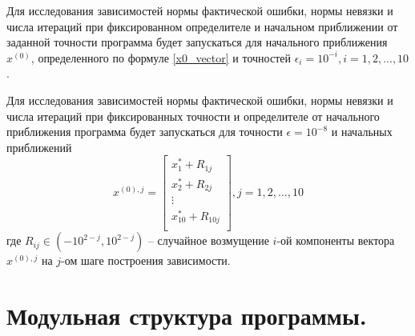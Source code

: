 \documentclass[a4paper, 12pt]{article}
\theoremstyle{definition}
\begin{document}
	Для исследования зависимостей нормы фактической ошибки, нормы невязки и числа итераций при фиксированном определителе и начальном приближении от заданной точности программа будет запускаться для начального приближения $x^{(0)}$, определенного по формуле \eqref{x0_vector} и точностей $\epsilon_i=10^{-i}, i=1,2,...,10$.
	
	Для исследования зависимостей нормы фактической ошибки, нормы невязки и числа итераций при фиксированных точности и определителе от начального приближения программа будет запускаться для точности $\epsilon=10^{-8}$ и начальных приближений
	\begin{equation} \label{start_vectors}
		x^{(0),j}=
		\begin{bmatrix}
			x^*_1+R_{1j}\\
			x^*_2+R_{2j}\\
			\vdots \\
			x^*_{10}+R_{10j}\\
		\end{bmatrix},
		j=1,2,...,10
	\end{equation}
	где $R_{ij}\in (-10^{2-j}, 10^{2-j})$ -- случайное возмущение $i$-ой компоненты вектора $x^{(0),j}$ на $j$-ом шаге построения зависимости.
	
	\section{Модульная структура программы.}
	
\end{document}
